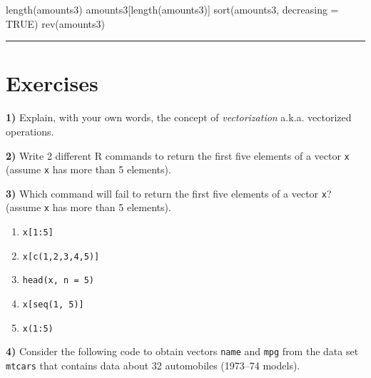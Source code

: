 \documentclass[
]{book}
\newenvironment{Shaded}{\begin{snugshade}}{\end{snugshade}}
\newcommand{\AttributeTok}[1]{\textcolor[rgb]{0.77,0.63,0.00}{#1}}
\newcommand{\CommentTok}[1]{\textcolor[rgb]{0.56,0.35,0.01}{\textit{#1}}}
\newcommand{\ConstantTok}[1]{\textcolor[rgb]{0.00,0.00,0.00}{#1}}
\newcommand{\FunctionTok}[1]{\textcolor[rgb]{0.00,0.00,0.00}{#1}}
\newcommand{\NormalTok}[1]{#1}
\newcommand{\OtherTok}[1]{\textcolor[rgb]{0.56,0.35,0.01}{#1}}
\newcommand{\SpecialCharTok}[1]{\textcolor[rgb]{0.00,0.00,0.00}{#1}}
\begin{document}
\begin{Shaded}
\begin{Highlighting}[]
\FunctionTok{length}\NormalTok{(amounts3)}
\NormalTok{amounts3[}\FunctionTok{length}\NormalTok{(amounts3)]}
\FunctionTok{sort}\NormalTok{(amounts3, }\AttributeTok{decreasing =} \ConstantTok{TRUE}\NormalTok{)}
\FunctionTok{rev}\NormalTok{(amounts3)}
\end{Highlighting}
\end{Shaded}

\begin{center}\rule{0.5\linewidth}{0.5pt}\end{center}

\hypertarget{exercises-3}{%
\section{Exercises}\label{exercises-3}}

\textbf{1)} Explain, with your own words, the concept of \emph{vectorization} a.k.a.
vectorized operations.

\textbf{2)} Write 2 different R commands to return the first five elements of a
vector \texttt{x} (assume \texttt{x} has more than 5 elements).

\textbf{3)} Which command will fail to return the first five elements of a vector
\texttt{x}? (assume \texttt{x} has more than 5 elements).

\begin{enumerate}
\def\labelenumi{\alph{enumi})}
\item
  \texttt{x{[}1:5{]}}
\item
  \texttt{x{[}c(1,2,3,4,5){]}}
\item
  \texttt{head(x,\ n\ =\ 5)}
\item
  \texttt{x{[}seq(1,\ 5){]}}
\item
  \texttt{x(1:5)}
\end{enumerate}

\textbf{4)} Consider the following code to obtain vectors \texttt{name} and \texttt{mpg} from the
data set \texttt{mtcars} that contains data about 32 automobiles (1973--74 models).

\begin{Shaded}
\end{Shaded}
\end{document}
